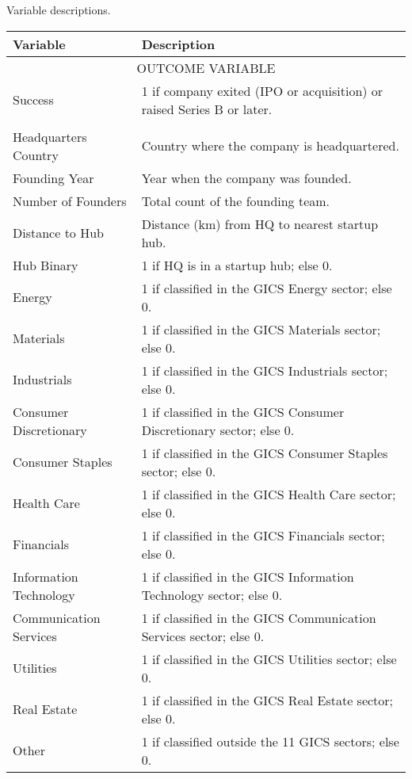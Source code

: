 \centering
{\footnotesize
\caption{Variable descriptions.}
\label{tab:var_desc}
\begin{tabular}{p{} p{}}
\toprule
Variable & Description \\
\midrule
\multicolumn{2}{c}{\tiny\textsc{OUTCOME VARIABLE}} \\
\midrule
Success & 1 if company exited (IPO or acquisition) or raised Series B or later. \\[0.4em]
\addlinespace[0.5em]
\midrule
\multicolumn{2}{c}{\tiny\textsc{FUNDAMENTAL VARIABLES}} \\
\midrule
Headquarters Country & Country where the company is headquartered. \\[0.4em]
Founding Year & Year when the company was founded. \\[0.4em]
Number of Founders & Total count of the founding team. \\[0.4em]
Distance to Hub & Distance (km) from HQ to nearest startup hub. \\[0.4em]
Hub Binary & 1 if HQ is in a startup hub; else 0. \\[0.4em]
Energy & 1 if classified in the GICS Energy sector; else 0. \\[0.4em]
Materials & 1 if classified in the GICS Materials sector; else 0. \\[0.4em]
Industrials & 1 if classified in the GICS Industrials sector; else 0. \\[0.4em]
Consumer Discretionary & 1 if classified in the GICS Consumer Discretionary sector; else 0. \\[0.4em]
Consumer Staples & 1 if classified in the GICS Consumer Staples sector; else 0. \\[0.4em]
Health Care & 1 if classified in the GICS Health Care sector; else 0. \\[0.4em]
Financials & 1 if classified in the GICS Financials sector; else 0. \\[0.4em]
Information Technology & 1 if classified in the GICS Information Technology sector; else 0. \\[0.4em]
Communication Services & 1 if classified in the GICS Communication Services sector; else 0. \\[0.4em]
Utilities & 1 if classified in the GICS Utilities sector; else 0. \\[0.4em]
Real Estate & 1 if classified in the GICS Real Estate sector; else 0. \\[0.4em]
Other & 1 if classified outside the 11 GICS sectors; else 0. \\[0.4em]

\end{tabular}}
